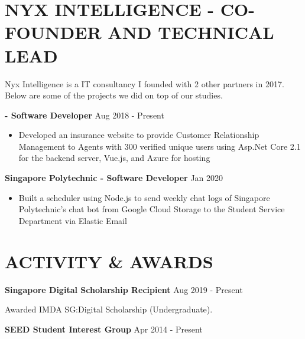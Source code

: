 \documentclass[11pt]{article} %
\begin{document}
\section*{NYX INTELLIGENCE - CO-FOUNDER AND TECHNICAL LEAD}

Nyx Intelligence is a IT consultancy I founded with 2 other partners in 2017. Below are some of the projects we did on top of our studies.

\smallskip

\textbf{\href{https://policyxchange.com}{\color{black}{PolicyXchange.com}} - Software Developer} \hfill Aug 2018 - Present

\smallskip
\begin{itemize}

    \item Developed an insurance website to provide Customer Relationship Management to Agents with 300 verified unique users using Asp.Net Core 2.1 for the backend server, Vue.js, and Azure for hosting

\end{itemize}

\medskip

\textbf{Singapore Polytechnic - Software Developer} \hfill Jan 2020

\smallskip
\begin{itemize}

    \item Built a scheduler using Node.js to send weekly chat logs of Singapore Polytechnic's chat bot from Google Cloud Storage to the Student Service Department via Elastic Email

\end{itemize}


\section*{ACTIVITY \& AWARDS}

\textbf{Singapore Digital Scholarship Recipient} \hfill Aug 2019 - Present

Awarded IMDA SG:Digital Scholarship (Undergraduate).

\bigskip

\textbf{SEED Student Interest Group} \hfill Apr 2014 - Present
\end{document}
